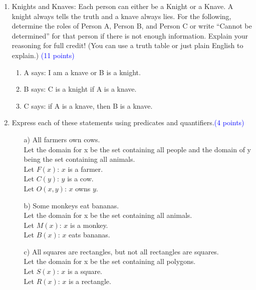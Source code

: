 \documentclass{article}
\newcommand{\pt}[1]{\textcolor{blue}{(#1 points)}}
\begin{document}
\begin{enumerate}
    \item Knights and Knaves: Each person can either be a Knight or a Knave. A knight always tells the truth and a knave always lies. For the following, determine the roles of Person A, Person B, and Person C or write “Cannot be determined” for that person if there is not enough information. Explain your reasoning for full credit! (You can use a truth table or just plain English to explain.) \pt{11}
    \begin{enumerate}
        \item A says: I am a knave or B is a knight.
        \item B says: C is a knight if A is a knave.
        \item C says: if A is a knave, then B is a knave.
    \end{enumerate}

    \item Express each of these statements using predicates and quantifiers.\pt{4}
    \begin{enumerate}
        \item[a)] All farmers own cows.\\

        Let the domain for x be the set containing all people and the domain of y being the set containing all animals.\\
        Let $F(x)$: $x$ is a farmer.\\
        Let $C(y)$: $y$ is a cow.\\
        Let $O(x, y)$: $x$ owns $y$.\\

        
        \item[b)] Some monkeys eat bananas.\\

        Let the domain for x be the set containing all animals.\\
        Let $M(x)$: $x$ is a monkey.\\
        Let $B(x)$: $x$ eats bananas.\\
        
        \item[c)] All squares are rectangles, but not all rectangles are squares.\\
        
        Let the domain for x be the set containing all polygons.\\
        Let $S(x)$: $x$ is a square.\\
        Let $R(x)$: $x$ is a rectangle.\\


\end{enumerate}
\end{enumerate}
\end{document}
